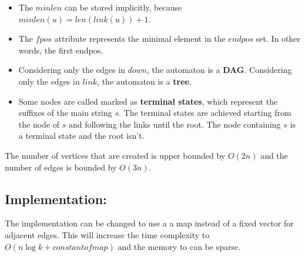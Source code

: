 \begin{itemize}
        \item The $minlen$ can be stored implicitly, because $minlen(u) = len(link(u)) + 1$.

        \item The $fpos$ attribute represents the minimal element in the $endpos$ set. In other words, the first endpos.

        \item Considering only the edges in $down$, the automaton is a \textbf{DAG}. Considering only the edges in $link$, the automaton is a \textbf{tree}.

        \item Some nodes are called marked as \textbf{terminal states}, which represent the suffixes of the main string $s$. 
        The terminal states are achieved starting from the node of $s$ and following the links until the root. 
        The node containing $s$ is a terminal state and the root isn't.

    \end{itemize}

    The number of vertices that are created is upper bounded by \textbf{$O(2n)$} and the number of edges is bounded by \textbf{$O(3n)$}.

    \subsection{Implementation:}

    The implementation can be changed to use a a map instead of a fixed vector for adjacent edges.
    This will increase the time complexity to $O(n \log{k} + constant of map)$ and the memory to can be sparse.

